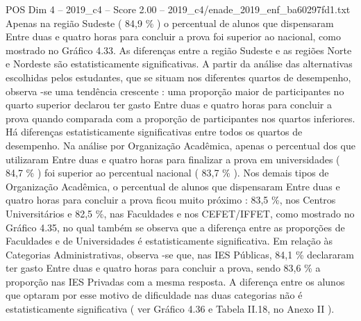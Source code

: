 \begin{textsample}{POS Dim 4 – 2019\_c4 – Score 2.00 – 2019\_c4/enade\_2019\_enf\_ba60297fd1.txt}
Apenas na região Sudeste ( 84,9 \% ) o percentual de alunos que dispensaram Entre duas e quatro horas para concluir a prova foi superior ao nacional, como mostrado no Gráfico 4.33.
As diferenças entre a região Sudeste e as regiões Norte e Nordeste são estatisticamente significativas.
A partir da análise das alternativas escolhidas pelos estudantes, que se situam nos diferentes quartos de desempenho, observa -se uma tendência crescente : uma proporção maior de participantes no quarto superior declarou ter gasto Entre duas e quatro horas para concluir a prova quando comparada com a proporção de participantes nos quartos inferiores.
Há diferenças estatisticamente significativas entre todos os quartos de desempenho.
Na análise por Organização Acadêmica, apenas o percentual dos que utilizaram Entre duas e quatro horas para finalizar a prova em universidades ( 84,7 \% ) foi superior ao percentual nacional ( 83,7 \% ).
Nos demais tipos de Organização Acadêmica, o percentual de alunos que dispensaram Entre duas e quatro horas para concluir a prova ficou muito próximo : 83,5 \%, nos Centros Universitários e 82,5 \%, nas Faculdades e nos CEFET/IFFET, como mostrado no Gráfico 4.35, no qual também se observa que a diferença entre as proporções de Faculdades e de Universidades é estatisticamente significativa.
Em relação às Categorias Administrativas, observa -se que, nas IES Públicas, 84,1 \% declararam ter gasto Entre duas e quatro horas para concluir a prova, sendo 83,6 \% a proporção nas IES Privadas com a mesma resposta.
A diferença entre os alunos que optaram por esse motivo de dificuldade nas duas categorias não é estatisticamente significativa ( ver Gráfico 4.36 e Tabela II.18, no Anexo II ).

\end{textsample}
